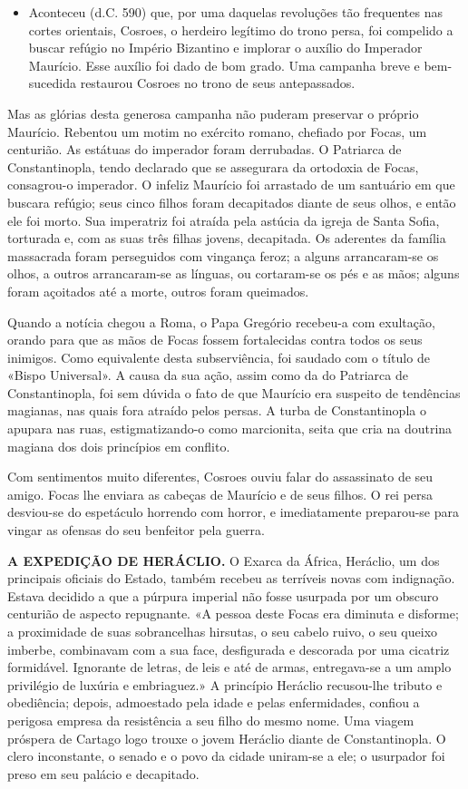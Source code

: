\documentclass[11pt,a5paper,twoside,openany]{book}
\begin{document}
\begin{itemize}
\item Aconteceu (d.C. 590) que, por uma daquelas revoluções tão frequentes nas cortes orientais, Cosroes, o herdeiro legítimo do trono persa, foi compelido a buscar refúgio no Império Bizantino e implorar o auxílio do Imperador Maurício. Esse auxílio foi dado de bom grado. Uma campanha breve e bem-sucedida restaurou Cosroes no trono de seus antepassados.
\end{itemize}
Mas as glórias desta generosa campanha não puderam preservar o próprio Maurício. Rebentou um motim no exército romano, chefiado por Focas, um centurião. As estátuas do imperador foram derrubadas. O Patriarca de Constantinopla, tendo declarado que se assegurara da ortodoxia de Focas, consagrou-o imperador. O infeliz Maurício foi arrastado de um santuário em que buscara refúgio; seus cinco filhos foram decapitados diante de seus olhos, e então ele foi morto. Sua imperatriz foi atraída pela astúcia da igreja de Santa Sofia, torturada e, com as suas três filhas jovens, decapitada. Os aderentes da família massacrada foram perseguidos com vingança feroz; a alguns arrancaram-se os olhos, a outros arrancaram-se as línguas, ou cortaram-se os pés e as mãos; alguns foram açoitados até a morte, outros foram queimados.

Quando a notícia chegou a Roma, o Papa Gregório recebeu-a com exultação, orando para que as mãos de Focas fossem fortalecidas contra todos os seus inimigos. Como equivalente desta subserviência, foi saudado com o título de «Bispo Universal». A causa da sua ação, assim como da do Patriarca de Constantinopla, foi sem dúvida o fato de que Maurício era suspeito de tendências magianas, nas quais fora atraído pelos persas. A turba de Constantinopla o apupara nas ruas, estigmatizando-o como marcionita, seita que cria na doutrina magiana dos dois princípios em conflito.

Com sentimentos muito diferentes, Cosroes ouviu falar do assassinato de seu amigo. Focas lhe enviara as cabeças de Maurício e de seus filhos. O rei persa desviou-se do espetáculo horrendo com horror, e imediatamente preparou-se para vingar as ofensas do seu benfeitor pela guerra.

\textbf{A EXPEDIÇÃO DE HERÁCLIO.} O Exarca da África, Heráclio, um dos principais oficiais do Estado, também recebeu as terríveis novas com indignação. Estava decidido a que a púrpura imperial não fosse usurpada por um obscuro centurião de aspecto repugnante. «A pessoa deste Focas era diminuta e disforme; a proximidade de suas sobrancelhas hirsutas, o seu cabelo ruivo, o seu queixo imberbe, combinavam com a sua face, desfigurada e descorada por uma cicatriz formidável. Ignorante de letras, de leis e até de armas, entregava-se a um amplo privilégio de luxúria e embriaguez.» A princípio Heráclio recusou-lhe tributo e obediência; depois, admoestado pela idade e pelas enfermidades, confiou a perigosa empresa da resistência a seu filho do mesmo nome. Uma viagem próspera de Cartago logo trouxe o jovem Heráclio diante de Constantinopla. O clero inconstante, o senado e o povo da cidade uniram-se a ele; o usurpador foi preso em seu palácio e decapitado.
\end{document}
